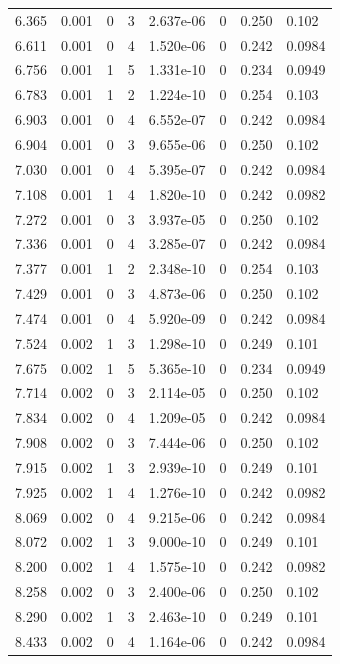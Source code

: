 \documentclass[preview]{standalone}
\begin{document}
{{{\begin{tabular}{L{1.2cm}C{1.2cm} C{0.3cm}C{0.5cm} C{1.4cm}C{1.4cm} C{1.4cm}C{1.4cm}}
  6.365  &  0.001  & 0     &  3 &  2.637e-06  & 0  & 0.250 &  0.102   \\ 
  6.611  &  0.001  & 0     &  4 &  1.520e-06  & 0  & 0.242 &  0.0984   \\ 
  6.756  &  0.001  & 1     &  5 &  1.331e-10  & 0  & 0.234 &  0.0949   \\ 
  6.783  &  0.001  & 1     &  2 &  1.224e-10  & 0  & 0.254 &  0.103   \\ 
  6.903  &  0.001  & 0     &  4 &  6.552e-07  & 0  & 0.242 &  0.0984   \\ 
  6.904  &  0.001  & 0     &  3 &  9.655e-06  & 0  & 0.250 &  0.102   \\ 
  7.030  &  0.001  & 0     &  4 &  5.395e-07  & 0  & 0.242 &  0.0984   \\ 
  7.108  &  0.001  & 1     &  4 &  1.820e-10  & 0  & 0.242 &  0.0982   \\ 
  7.272  &  0.001  & 0     &  3 &  3.937e-05  & 0  & 0.250 &  0.102   \\ 
  7.336  &  0.001  & 0     &  4 &  3.285e-07  & 0  & 0.242 &  0.0984   \\ 
  7.377  &  0.001  & 1     &  2 &  2.348e-10  & 0  & 0.254 &  0.103   \\ 
  7.429  &  0.001  & 0     &  3 &  4.873e-06  & 0  & 0.250 &  0.102   \\ 
  7.474  &  0.001  & 0     &  4 &  5.920e-09  & 0  & 0.242 &  0.0984   \\ 
  7.524  &  0.002  & 1     &  3 &  1.298e-10  & 0  & 0.249 &  0.101   \\ 
  7.675  &  0.002  & 1     &  5 &  5.365e-10  & 0  & 0.234 &  0.0949   \\ 
  7.714  &  0.002  & 0     &  3 &  2.114e-05  & 0  & 0.250 &  0.102   \\ 
  7.834  &  0.002  & 0     &  4 &  1.209e-05  & 0  & 0.242 &  0.0984   \\ 
  7.908  &  0.002  & 0     &  3 &  7.444e-06  & 0  & 0.250 &  0.102   \\ 
  7.915  &  0.002  & 1     &  3 &  2.939e-10  & 0  & 0.249 &  0.101   \\ 
  7.925  &  0.002  & 1     &  4 &  1.276e-10  & 0  & 0.242 &  0.0982   \\ 
  8.069  &  0.002  & 0     &  4 &  9.215e-06  & 0  & 0.242 &  0.0984   \\ 
  8.072  &  0.002  & 1     &  3 &  9.000e-10  & 0  & 0.249 &  0.101   \\ 
  8.200  &  0.002  & 1     &  4 &  1.575e-10  & 0  & 0.242 &  0.0982   \\ 
  8.258  &  0.002  & 0     &  3 &  2.400e-06  & 0  & 0.250 &  0.102   \\ 
  8.290  &  0.002  & 1     &  3 &  2.463e-10  & 0  & 0.249 &  0.101   \\ 
  8.433  &  0.002  & 0     &  4 &  1.164e-06  & 0  & 0.242 &  0.0984   \\ 
\hline 
\end{tabular} 

}}}
\end{document}
